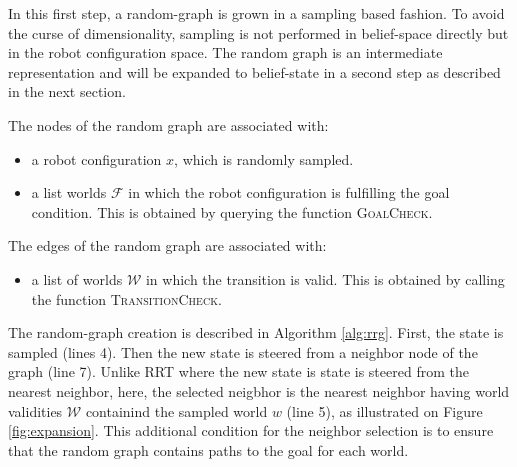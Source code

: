 \documentclass[letterpaper, 10 pt, conference]{ieeeconf}  %
\begin{document}
In this first step, a random-graph is grown in a sampling based fashion. To avoid the curse of dimensionality, sampling is not performed in belief-space directly but in the robot configuration space. The random graph is an intermediate representation and will be expanded to belief-state in a second step as described in the next section.

The nodes of the random graph are associated with:
\begin{itemize}
\item a robot configuration $x$, which is randomly sampled.
\item a list worlds $\mathcal{F}$ in which the robot configuration is fulfilling the goal condition. This is obtained by querying the function \textsc{GoalCheck}. 
\end{itemize} 

The edges of the random graph are associated with:
\begin{itemize}
\item a list of worlds $\mathcal{W}$ in which the transition is valid. This is obtained by calling the function \textsc{TransitionCheck}.
\end{itemize}



The random-graph creation is described in Algorithm \ref{alg:rrg}. First, the state is sampled (lines 4). Then the new state is steered from a neighbor node of the graph (line 7). Unlike RRT where the new state is state is steered from the nearest neighbor, here, the selected neigbhor is the nearest neighbor having world validities $\mathcal{W}$ containind the sampled world $w$ (line 5), as illustrated on Figure \ref{fig:expansion}. This additional condition for the neighbor selection is to ensure that the random graph contains paths to the goal for each world.
 
\end{document}
